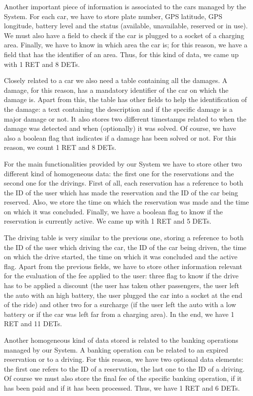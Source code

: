 Another important piece of information is associated to the cars managed by the System. For each car, we have to store plate number, GPS latitude, GPS longitude, battery level and the status (available, unavailable, reserved or in use). We must also have a field to check if the car is plugged to a socket of a charging area. Finally, we have to know in which area the car is; for this reason, we have a field that has the identifier of an area. Thus, for this kind of data, we came up with 1 RET and 8 DETs.
\bigskip

Closely related to a car we also need a table containing all the damages. A damage, for this reason, has a mandatory identifier of the car on which the damage is. Apart from this, the table has other fields to help the identification of the damage: a text containing the description and if the specific damage is a major damage or not. It also stores two different timestamps related to when the damage was detected and when (optionally) it was solved. Of course, we have also a boolean flag that indicates if a damage has been solved or not. For this reason, we count 1 RET and 8 DETs.
\bigskip

For the main functionalities provided by our System we have to store other two different kind of homogeneous data: the first one for the reservations and the second one for the drivings.
First of all, each reservation has a reference to both the ID of the user which has made the reservation and the ID of the car being reserved. Also, we store the time on which the reservation was made and the time on which it was concluded. Finally, we have a boolean flag to know if the reservation is currently active.
We came up with 1 RET and 5 DETs.
\bigskip

The driving table is very similar to the previous one, storing a reference to both the ID of the user which driving the car, the ID of the car being driven, the time on which the drive started, the time on which it was concluded and the active flag. Apart from the previous fields, we have to store other information relevant for the evaluation of the fee applied to the user: three flag to know if the drive has to be applied a discount (the user has taken other passengers, the user left the auto with an high battery, the user plugged the car into a socket at the end of the ride) and other two for a surcharge (if the user left the auto with a low battery or if the car was left far from a charging area). In the end, we have 1 RET and 11 DETs.
\bigskip

Another homogeneous kind of data stored is related to the banking operations managed by our System. A banking operation can be related to an expired reservation or to a driving. For this reason, we have two optional data elements: the first one refers to the ID of a reservation, the last one to the ID of a driving. Of course we must also store the final fee of the specific banking operation, if it has been paid and if it has been processed. Thus, we have 1 RET and 6 DETs.
\bigskip

